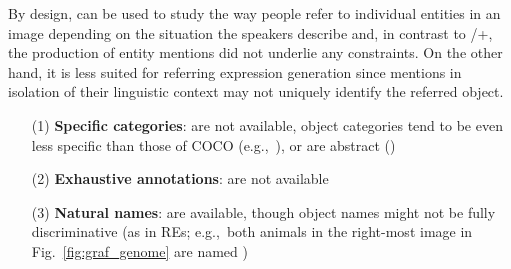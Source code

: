 By design, \flickr can be used to study the way people refer to individual entities in an image depending on the situation the speakers describe and,  
in contrast to /+, the production of entity mentions did not underlie any constraints. 
On the other hand, it is less suited for referring expression generation since mentions in isolation of their linguistic context may not uniquely identify the referred object. 

\begin{itemize}
     		\item[(1)] \textbf{Specific categories}: are not available, object categories tend to be even less specific than those of COCO (e.g.,~), or are abstract ()
		\item[(2)] \textbf{Exhaustive annotations}: are not available
		   \item[(3)] \textbf{Natural names}: are available, though object names might not be fully discriminative (as in REs; e.g.,~both animals in the right-most image in Fig.~\ref{fig:graf_genome} are named )

\end{itemize}

